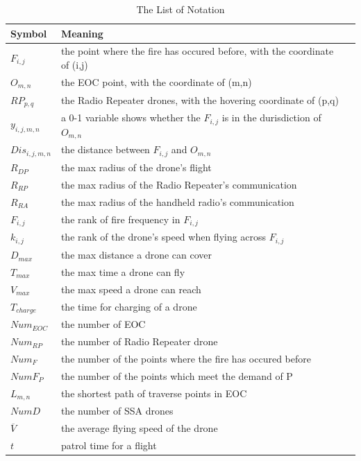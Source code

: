 \documentclass{mcmthesis}
\begin{document}
\begin{center}
  \begin{longtable}{p{}p{}m{}}
  \caption{The List of Notation}\\
  \hline
  Symbol& Meaning \\
  \hline
  
  $F_{i,j}$      & the point where the fire has occured before, with the coordinate of (i,j)\\
  $O_{m,n}$      & the EOC point, with the coordinate of (m,n)\\
  $RP_{p,q}$    &   the Radio Repeater drones, with the hovering coordinate of (p,q)\\
  $y_{i,j,m,n}$   &  a 0-1 variable shows whether the  $F_{i,j}$ is in the durisdiction of $O_{m,n}$ \\
  $Dis_{i,j,m,n}$     &  the distance between  $F_{i,j}$ and $O_{m,n}$  \\
     $R_{DP}$  &  the max radius of the drone's flight\\
     $R_{RP}$ &  the max radius of the Radio Repeater's communication \\
     $R_{RA}$ &  the max radius of the handheld radio's communication
     \\
     $F_{i,j}$ &  the rank of fire frequency in  $F_{i,j}$
     \\
     $k_{i,j}$&  the rank of the drone's speed when flying across  $F_{i,j}$
     \\
     $D_{max}$ &  the max distance a drone can cover\\
      $T_{max}$ &the max time a drone can fly   \\
       $V_{max}$&   the max speed a drone can reach       \\
     $T_{charge}$  & the time for charging of a drone  \\
     $Num_{EOC}$ & the number of EOC  \\
     $Num_{RP}$ &  the number of Radio Repeater drone     \\
     $Num_{F}$         &    the number of the points where the fire has occured before     \\
     $NumF_{P}$        &  the number of the points which meet the demand of P\\
     $L_{m,n}$& the shortest path of traverse points in EOC  \\
     $NumD$ &the number of SSA drones\\
    $\overline{V} $ & the average flying speed of the drone\\
     $t$ & patrol time for a flight\\
  \hline                                                       
   \end{longtable}
   \end{center}
\end{document}
